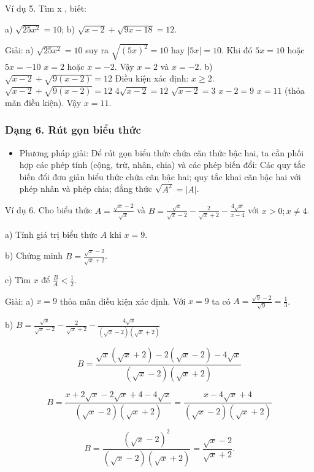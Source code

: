 \documentclass[%
    fontsize=12pt,%
    chapterprefix=false,%
    open=right,%
    twoside=false,%
    numbers=noenddot,%
    headings=optiontohead,%
    final,%
    DIV=15,%
    parskip=half %
]{scrbook}
\begin{document}

Ví dụ 5. Tìm x , biết:

a) $ \sqrt{25x^2} = 10 $;        b) $ \sqrt{x - 2} + \sqrt{9x - 18} = 12 $.

Giải: a) $ \sqrt{25x^2} = 10 $ suy ra $ \sqrt{(5x)^2} = 10 $ hay $ |5x| = 10 $. Khi đó $ 5x = 10 $ hoặc $ 5x = -10 $ $ x = 2 $ hoặc $ x = -2 $. Vậy $ x = 2 $ và $ x = -2 $. b) $ \sqrt{x - 2} + \sqrt{9(x - 2)} = 12 $ Điều kiện xác định: $ x \geq 2 $. $ \sqrt{x - 2} + \sqrt{9(x - 2)} = 12 $ $ 4\sqrt{x - 2} = 12 $ $ \sqrt{x - 2} = 3 $ $ x - 2 = 9 $ $ x = 11 $ (thỏa mãn điều kiện). Vậy $ x = 11 $.
\subsubsection{Dạng 6. Rút gọn biểu thức}

\begin{itemize}
  \item Phương pháp giải: Để rút gọn biểu thức chứa căn thức bậc hai, ta cần phối hợp các phép tính (cộng, trừ, nhân, chia) và các phép biến đổi: Các quy tắc biến đổi đơn giản biểu thức chứa căn bậc hai; quy tắc khai căn bậc hai với phép nhân và phép chia; đẳng thức $ \sqrt{A^2} = |A| $.
\end{itemize}

Ví dụ 6. Cho biểu thức $ A = \frac{\sqrt{x} - 2}{\sqrt{x}} $ và $ B = \frac{\sqrt{x}}{\sqrt{x} - 2} - \frac{2}{\sqrt{x} + 2} - \frac{4\sqrt{x}}{x - 4} $ với $ x > 0; x \neq 4 $.

a) Tính giá trị biểu thức $ A $ khi $ x = 9 $.

b) Chứng minh $ B = \frac{\sqrt{x} - 2}{\sqrt{x} + 2} $.

c) Tìm $ x $ để $ \frac{B}{A} < \frac{1}{2} $.

Giải: a) $ x = 9 $ thỏa mãn điều kiện xác định. Với $ x = 9 $ ta có $ A = \frac{\sqrt{9} - 2}{\sqrt{9}} = \frac{1}{3} $.


b) $ B = \frac{\sqrt{x}}{\sqrt{x}-2} - \frac{2}{\sqrt{x}+2} - \frac{4\sqrt{x}}{(\sqrt{x}-2)(\sqrt{x}+2)} $

\[
B = \frac{\sqrt{x}(\sqrt{x}+2)-2(\sqrt{x}-2)-4\sqrt{x}}{(\sqrt{x}-2)(\sqrt{x}+2)}
\]

\[
B = \frac{x+2\sqrt{x}-2\sqrt{x}+4-4\sqrt{x}}{(\sqrt{x}-2)(\sqrt{x}+2)} = \frac{x-4\sqrt{x}+4}{(\sqrt{x}-2)(\sqrt{x}+2)}
\]

\[
B = \frac{(\sqrt{x}-2)^2}{(\sqrt{x}-2)(\sqrt{x}+2)} = \frac{\sqrt{x}-2}{\sqrt{x}+2}.
\]
\end{document}
